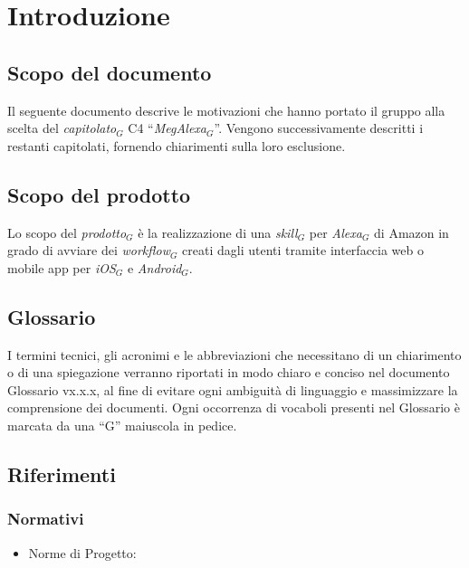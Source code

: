 \chapter{Introduzione}
\section{Scopo del documento}
Il seguente documento  descrive le motivazioni che hanno portato il gruppo alla scelta del \textit{capitolato$_{G}$} C4 “\textit{MegAlexa$_{G}$}”. Vengono successivamente descritti i restanti capitolati, fornendo chiarimenti sulla loro esclusione.
\section{Scopo del prodotto}
Lo scopo del \textit{prodotto$_{G}$} è la realizzazione  di  una \textit{skill$_{G}$} per \textit{Alexa$_{G}$} di Amazon in grado di avviare dei \textit{workflow$_{G}$} creati dagli utenti tramite interfaccia web o mobile app per \textit{iOS$_{G}$} e \textit{Android$_{G}$}. 
\section{Glossario} 

 I termini tecnici, gli acronimi e le abbreviazioni che necessitano  di un chiarimento o di una spiegazione verranno riportati in modo chiaro e conciso nel documento Glossario vx.x.x, al fine di evitare ogni ambiguità di linguaggio e massimizzare la comprensione dei documenti.
 Ogni occorrenza di vocaboli presenti nel Glossario è marcata da una “G”
 maiuscola in pedice.
 \begin{center}
 	
 \end{center}

\section{Riferimenti}
\subsection{Normativi}
\begin{itemize}
	\item Norme di Progetto: %
\end{itemize}
